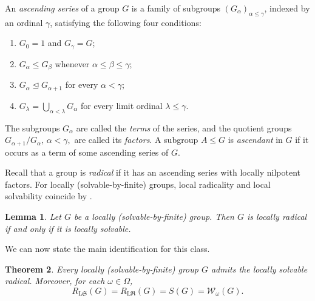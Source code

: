 \documentclass[10pt,a4paper]{amsart}
\numberwithin{equation}{section}
\newtheorem{theorem}{Theorem}[section]
\newtheorem{lemma}[theorem]{Lemma}
\numberwithin{equation}{section}
\begin{document}
An \emph{ascending series} of a group $G$ is a family of subgroups $(G_\alpha)_{\alpha\leq\gamma}$, indexed by an ordinal $\gamma$, satisfying the following four conditions:
\begin{enumerate}
\item[(i)] $G_0=1$ and $G_\gamma=G$;
\item[(ii)] $G_\alpha\leq G_\beta$ whenever $\alpha\leq\beta\leq\gamma$;
\item[(iii)] $G_\alpha\trianglelefteq G_{\alpha+1}$ for every $\alpha<\gamma$;
\item[(iv)] $G_\lambda=\bigcup_{\alpha<\lambda}G_\alpha$ for every limit ordinal $\lambda\leq\gamma$.
\end{enumerate}
The subgroups $G_\alpha$ are
called the \emph{terms} of the series, and the quotient groups
$G_{\alpha+1}/G_\alpha,
\,
\alpha<\gamma,$
are called its \emph{factors}. A subgroup $A\leq G$ is \emph{ascendant} in $G$ if it occurs as a term of some ascending series of $G$.

Recall that a group is \emph{radical} if it has an ascending series with  locally nilpotent factors. For locally (solvable-by-finite) groups, local radicality and local solvability coincide by \cite[Theorem~2.6]{CNH2025}.

\begin{lemma} \label{lem:locradislocsolonlocsolbyfinite} Let $G$ be a locally \textup{(}solvable-by-finite\textup{)} group. Then $G$ is locally radical if and only if it is locally solvable. 
\end{lemma} 

We can now state the main identification for this class. 


\begin{theorem} \label{theo:locally-finite} 
Every locally \textup{(}solvable-by-finite\textup{)} group $G$ admits
the locally solvable radical.
Moreover, for each $\omega\in\Omega$,
  $$R_{\mathrm{L}\mathfrak{S}}(G)
  =
  R_{\mathrm{L}\mathfrak{R}}(G)
  =
  S(G)
  =
  \mathcal{W}_{\omega}(G).$$
\end{theorem}
\end{document}
